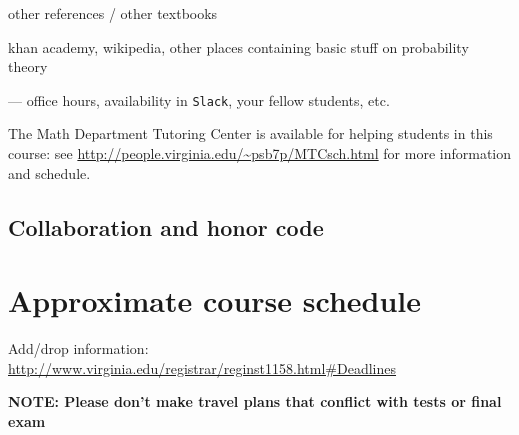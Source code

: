 \documentclass[oneside,11pt]{amsart}
\begin{document}
other references / other textbooks

khan academy, wikipedia, other places containing basic stuff on probability theory

--- office hours, availability in \texttt{Slack}, 
your fellow students, etc.

The Math Department Tutoring Center is available for helping students in this course: 
see \url{http://people.virginia.edu/~psb7p/MTCsch.html}
for more information and schedule. 

\subsection{Collaboration and honor code}
\label{collaboration}



\section{Approximate course schedule}

\noindent Add/drop information: \url{http://www.virginia.edu/registrar/reginst1158.html#Deadlines}
\smallskip

\noindent \textbf{NOTE: Please don't make travel plans that conflict with tests or final exam}
\smallskip
\end{document}
